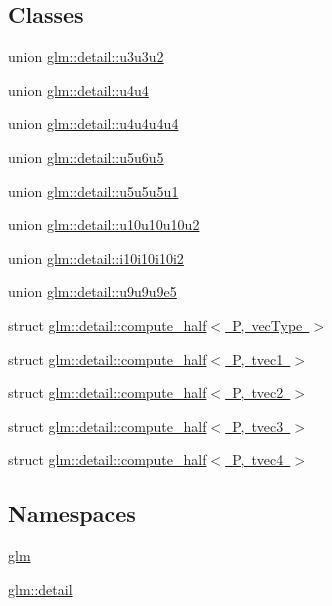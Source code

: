 \subsection*{Classes}
\begin{DoxyCompactItemize}
\item 
union \mbox{\hyperlink{unionglm_1_1detail_1_1u3u3u2}{glm\+::detail\+::u3u3u2}}
\item 
union \mbox{\hyperlink{unionglm_1_1detail_1_1u4u4}{glm\+::detail\+::u4u4}}
\item 
union \mbox{\hyperlink{unionglm_1_1detail_1_1u4u4u4u4}{glm\+::detail\+::u4u4u4u4}}
\item 
union \mbox{\hyperlink{unionglm_1_1detail_1_1u5u6u5}{glm\+::detail\+::u5u6u5}}
\item 
union \mbox{\hyperlink{unionglm_1_1detail_1_1u5u5u5u1}{glm\+::detail\+::u5u5u5u1}}
\item 
union \mbox{\hyperlink{unionglm_1_1detail_1_1u10u10u10u2}{glm\+::detail\+::u10u10u10u2}}
\item 
union \mbox{\hyperlink{unionglm_1_1detail_1_1i10i10i10i2}{glm\+::detail\+::i10i10i10i2}}
\item 
union \mbox{\hyperlink{unionglm_1_1detail_1_1u9u9u9e5}{glm\+::detail\+::u9u9u9e5}}
\item 
struct \mbox{\hyperlink{structglm_1_1detail_1_1compute__half}{glm\+::detail\+::compute\+\_\+half$<$ P, vec\+Type $>$}}
\item 
struct \mbox{\hyperlink{structglm_1_1detail_1_1compute__half_3_01_p_00_01tvec1_01_4}{glm\+::detail\+::compute\+\_\+half$<$ P, tvec1 $>$}}
\item 
struct \mbox{\hyperlink{structglm_1_1detail_1_1compute__half_3_01_p_00_01tvec2_01_4}{glm\+::detail\+::compute\+\_\+half$<$ P, tvec2 $>$}}
\item 
struct \mbox{\hyperlink{structglm_1_1detail_1_1compute__half_3_01_p_00_01tvec3_01_4}{glm\+::detail\+::compute\+\_\+half$<$ P, tvec3 $>$}}
\item 
struct \mbox{\hyperlink{structglm_1_1detail_1_1compute__half_3_01_p_00_01tvec4_01_4}{glm\+::detail\+::compute\+\_\+half$<$ P, tvec4 $>$}}
\end{DoxyCompactItemize}
\subsection*{Namespaces}
\begin{DoxyCompactItemize}
\item 
 \mbox{\hyperlink{namespaceglm}{glm}}
\item 
 \mbox{\hyperlink{namespaceglm_1_1detail}{glm\+::detail}}
\end{DoxyCompactItemize}
